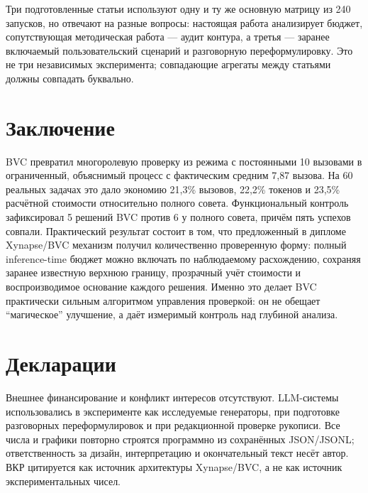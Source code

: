 \documentclass[11pt]{article}
\begin{document}
Три подготовленные статьи используют одну и ту же основную матрицу из 240
запусков, но отвечают на разные вопросы: настоящая работа анализирует бюджет,
сопутствующая методическая работа --- аудит контура, а третья --- заранее
включаемый пользовательский сценарий и разговорную переформулировку. Это не
три независимых эксперимента; совпадающие агрегаты между статьями должны
совпадать буквально.

\section{Заключение}

BVC превратил многоролевую проверку из режима с постоянными 10 вызовами в
ограниченный, объяснимый процесс с фактическим средним 7,87 вызова. На 60 реальных
задачах это дало экономию 21,3\% вызовов, 22,2\% токенов и 23,5\%
расчётной стоимости относительно полного совета. Функциональный контроль
зафиксировал 5 решений BVC против 6 у полного совета, причём пять успехов
совпали. Практический результат состоит в том, что предложенный в дипломе
Xynapse/BVC механизм \cite{khalilov2026} получил количественно проверенную
форму: полный inference-time бюджет можно включать по наблюдаемому
расхождению, сохраняя заранее известную верхнюю границу, прозрачный учёт
стоимости и воспроизводимое основание каждого решения. Именно это делает BVC
практически сильным алгоритмом управления проверкой: он не обещает
\enquote{магическое} улучшение, а даёт измеримый контроль над глубиной анализа.

\section*{Декларации}

Внешнее финансирование и конфликт интересов отсутствуют. LLM-системы
использовались в эксперименте как исследуемые генераторы, при подготовке
разговорных переформулировок и при редакционной проверке рукописи. Все числа и
графики повторно строятся программно из сохранённых JSON/JSONL; ответственность
за дизайн, интерпретацию и окончательный текст несёт автор. ВКР
\cite{khalilov2026} цитируется как источник архитектуры Xynapse/BVC, а не как
источник экспериментальных чисел.

\printbibliography[title={Литература}]
\end{document}
